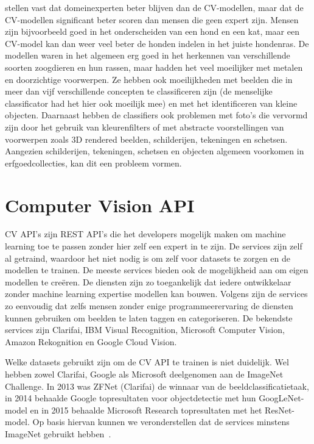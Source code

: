 \textcite{Russakovsky2014} stellen vast dat domeinexperten beter blijven dan de CV-modellen, maar dat de CV-modellen significant beter scoren dan mensen die geen expert zijn. Mensen zijn bijvoorbeeld goed in het onderscheiden van een hond en een kat, maar een CV-model kan dan weer veel beter de honden indelen in het juiste hondenras. De modellen waren in het algemeen erg goed in het herkennen van verschillende soorten zoogdieren en hun rassen, maar hadden het veel moeilijker met metalen en doorzichtige voorwerpen. Ze hebben ook moeilijkheden met beelden die in meer dan vijf verschillende concepten te classificeren zijn (de menselijke classificator had het hier ook moeilijk mee) en met het identificeren van kleine  objecten. Daarnaast hebben de classifiers ook problemen met foto’s die vervormd zijn door het gebruik van kleurenfilters  of met abstracte voorstellingen van voorwerpen zoals 3D rendered beelden, schilderijen, tekeningen en schetsen. Aangezien schilderijen, tekeningen, schetsen en objecten algemeen voorkomen in erfgoedcollecties, kan dit een probleem vormen.

\section{Computer Vision API}
\label{sec:CV-API}


CV API’s zijn REST API’s die het developers mogelijk maken om machine learning toe te passen zonder hier zelf een expert in te zijn.  De services zijn zelf al getraind, waardoor het niet nodig is om zelf voor datasets  te zorgen en de modellen te trainen. De meeste services bieden ook de mogelijkheid aan om eigen modellen te cre\"{e}ren. De diensten zijn zo toegankelijk dat iedere ontwikkelaar zonder machine learning expertise modellen kan bouwen. Volgens \textcite{Lardinois2018} zijn de services zo eenvoudig dat zelfs mensen zonder enige programmeerervaring de diensten kunnen gebruiken om beelden te laten taggen en categoriseren. De bekendste services zijn Clarifai, IBM Visual Recognition, Microsoft Computer Vision, Amazon Rekognition en Google Cloud Vision. 

Welke datasets gebruikt zijn om de CV API te trainen is niet duidelijk. Wel hebben zowel Clarifai, Google als Microsoft deelgenomen aan de ImageNet Challenge. In 2013 was ZFNet (Clarifai) de winnaar van de beeldclassificatietaak, in 2014 behaalde Google topresultaten voor objectdetectie met hun GoogLeNet-model en in 2015 behaalde Microsoft Research topresultaten met het ResNet-model. Op basis hiervan kunnen we veronderstellen dat de services minstens ImageNet gebruikt hebben~\autocite{Brownlee2019a}.

